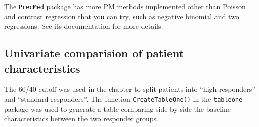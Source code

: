 \documentclass[
  letterpaper,
  DIV=11,
  numbers=noendperiod]{scrreprt}
\begin{document}
The \texttt{PrecMed} package has more PM methods implemented other than
Poisson and contrast regression that you can try, such as negative
binomial and two regressions. See its documentation for more details.

\hypertarget{univariate-comparision-of-patient-characteristics}{%
\subsection{Univariate comparision of patient
characteristics}\label{univariate-comparision-of-patient-characteristics}}

The 60/40 cutoff was used in the chapter to split patients into ``high
responders'' and ``standard responders''. The function
\texttt{CreateTableOne()} in the \texttt{tableone} package was used to
generate a table comparing side-by-side the baseline characteristics
between the two responder groups.
\end{document}
